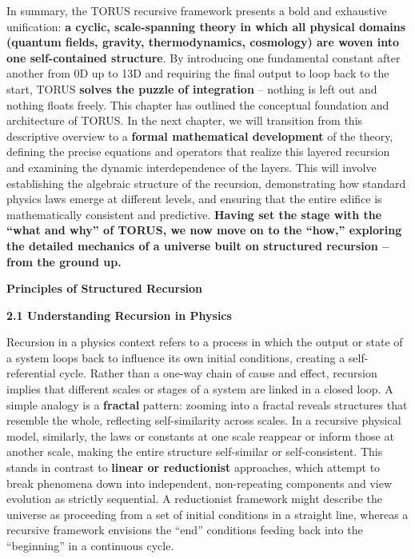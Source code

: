 In summary, the TORUS recursive framework presents a bold and exhaustive
unification: \textbf{a cyclic, scale-spanning theory in which all
physical domains (quantum fields, gravity, thermodynamics, cosmology)
are woven into one self-contained structure}. By introducing one
fundamental constant after another from 0D up to 13D and requiring the
final output to loop back to the start, TORUS \textbf{solves the puzzle
of integration} -- nothing is left out and nothing floats freely. This
chapter has outlined the conceptual foundation and architecture of
TORUS. In the next chapter, we will transition from this descriptive
overview to a \textbf{formal mathematical development} of the theory,
defining the precise equations and operators that realize this layered
recursion and examining the dynamic interdependence of the layers. This
will involve establishing the algebraic structure of the recursion,
demonstrating how standard physics laws emerge at different levels, and
ensuring that the entire edifice is mathematically consistent and
predictive. \textbf{Having set the stage with the ``what and why'' of
TORUS, we now move on to the ``how,'' exploring the detailed mechanics
of a universe built on structured recursion -- from the ground up.}

\textbf{Principles of Structured Recursion}

\textbf{2.1 Understanding Recursion in Physics}

Recursion in a physics context refers to a process in which the output
or state of a system loops back to influence its own initial conditions,
creating a self-referential cycle. Rather than a one-way chain of cause
and effect, recursion implies that different scales or stages of a
system are linked in a closed loop. A simple analogy is a
\textbf{fractal} pattern: zooming into a fractal reveals structures that
resemble the whole, reflecting self-similarity across scales​. In a
recursive physical model, similarly, the laws or constants at one scale
reappear or inform those at another scale, making the entire structure
self-similar or self-consistent. This stands in contrast to
\textbf{linear or reductionist} approaches, which attempt to break
phenomena down into independent, non-repeating components and view
evolution as strictly sequential. A reductionist framework might
describe the universe as proceeding from a set of initial conditions in
a straight line, whereas a recursive framework envisions the ``end''
conditions feeding back into the ``beginning'' in a continuous cycle.


